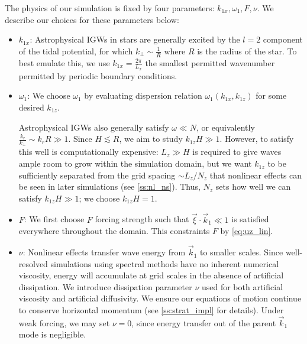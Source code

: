 \documentclass[
        fleqn,
        usenatbib,
    ]{mnras}
\newcommand*{\p}[1]{\left(#1\right)}
\begin{document}
The physics of our simulation is fixed by four parameters: $k_{1x}, \omega_1, F,
\nu$. We describe our choices for these parameters below:
\begin{itemize}
    \item $k_{1x}$: Astrophysical IGWs in stars are generally excited by the $l
        = 2$ component of the tidal potential, for which $k_{\perp} \sim
        \frac{1}{R}$ where $R$ is the radius of the star. To best emulate this,
        we use $k_{1x} = \frac{2\pi}{L_x}$ the smallest permitted wavenumber
        permitted by periodic boundary conditions.

    \item $\omega_1$: We choose $\omega_1$ by evaluating dispersion relation
        $\omega_1\p{k_{1x}, k_{1z}}$ for some desired $k_{1z}$.

        Astrophysical IGWs also generally satisfy $\omega \ll N$, or
        equivalently $\frac{k_r}{k_{\perp}} \sim k_rR \gg 1$. Since $H \lesssim
        R$, we aim to study $k_{1z}H \gg 1$. However, to satisfy this well is
        computationally expensive: $L_z \gg H$ is required to give waves ample
        room to grow within the simulation domain, but we want $k_{1z}$ to be
        sufficiently separated from the grid spacing $\sim L_z / N_z$ that
        nonlinear effects can be seen in later simulations (see
        \autoref{ss:nl_ns}). Thus, $N_z$ sets how well we can satisfy $k_{1z}H
        \gg 1$; we choose $k_{1z}H = 1$.

    \item $F$: We first choose $F$ forcing strength such that $\vec{\xi} \cdot
        \vec{k}_1 \ll 1$ is satisfied everywhere throughout the domain. This
        constraints $F$ by \autoref{eq:uz_lin}.

    \item $\nu$: Nonlinear effects transfer wave energy from $\vec{k}_{1}$ to
        smaller scales. Since well-resolved simulations using spectral methods
        have no inherent numerical viscosity, energy will accumulate at grid
        scales in the absence of artificial dissipation. We introduce
        dissipation parameter $\nu$ used for both artificial viscosity and artificial
        diffusivity. We ensure our equations of motion continue to conserve
        horizontal momentum (see \autoref{ss:strat_impl} for details). Under
        weak forcing, we may set $\nu = 0$, since energy transfer out of the
        parent $\vec{k}_1$ mode is negligible.
\end{itemize}
\end{document}
